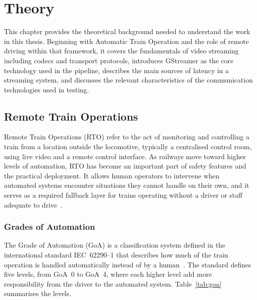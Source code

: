 \section{Theory}
This chapter provides the theoretical background needed to understand the work in this thesis. Beginning with Automatic Train Operation and the role of remote driving within that framework, it covers the fundamentals of video streaming including codecs and transport protocols, introduces GStreamer as the core technology used in the pipeline, describes the main sources of latency in a streaming system, and discusses the relevant characteristics of the communication technologies used in testing.

\subsection{Remote Train Operations}\label{sec:rto}
 
Remote Train Operations (RTO) refer to the act of monitoring and controlling a train from a location outside the locomotive, typically a centralised control room, using live video and a remote control interface. As railways move toward higher levels of automation, RTO has become an important part of safety features and the practical deployment. It allows human operators to intervene when automated systems encounter situations they cannot handle on their own, and it serves as a required fallback layer for trains operating without a driver or staff adequate to drive~\cite{jurgensen2025, fp2r2dato2023d5_4}.
 

\subsubsection{Grades of Automation}\label{subsec:goa}
 
The Grade of Automation (GoA) is a classification system defined in the international standard IEC~62290--1 that describes how much of the train operation is handled automatically instead of by a human~\cite{iec62290}. The standard defines five levels, from GoA~0 to GoA~4, where each higher level add more responsibility from the driver to the automated system. Table~\ref{tab:goa} summarises the levels.
 
